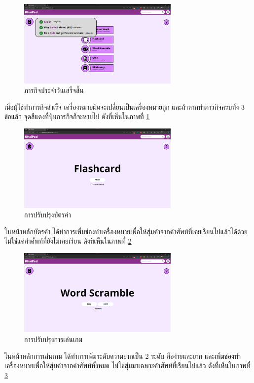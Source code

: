 \documentclass[12pt,oneside,openright,a4paper]{cpe-thai-project}
\begin{document}
\begin{figure}[!h]\centering
	\includegraphics[width=0.7\textwidth, keepaspectratio=true]{image/chap4/Final/quest done.png}
	\caption{{ภารกิจประจำวันเสร็จสิ้น}}\label{fig:chap4FinQuestDone}
\end{figure}
\hspace{1cm}
เมื่อผู้ใช้ทำภารกิจสำเร็จ เครื่องหมายผิดจะเปลี่ยนเป็นเครื่องหมายถูก และถ้าหากทำภารกิจครบทั้ง 3 ข้อแล้ว
จุดสีแดงที่ปุ่มภารกิจก็จะหายไป ดังที่เห็นในภาพที่ \ref{fig:chap4FinQuestDone}

\pagebreak
\begin{figure}[!h]\centering
	\includegraphics[width=0.7\textwidth, keepaspectratio=true]{image/chap4/Final/flash.png}
	\caption{{การปรับปรุงบัตรคำ}}\label{fig:chap4FinFlash}
\end{figure}
\hspace{1cm}
ในหน้าหลักบัตรคำ ได้ทำการเพิ่มช่องทำเครื่องหมายเพื่อให้สุ่มคำจากคำศัพท์ที่เคยเรียนไปแล้วได้ด้วย ไม่ใช่แค่คำศัพท์ที่ยังไม่เคยเรียน
ดังที่เห็นในภาพที่ \ref{fig:chap4FinFlash}

\begin{figure}[!h]\centering
	\includegraphics[width=0.7\textwidth, keepaspectratio=true]{image/chap4/Final/game.png}
	\caption{{การปรับปรุงการเล่นเกม}}\label{fig:chap4FinGame}
\end{figure}
\hspace{1cm}
ในหน้าหลักการเล่นเกม ได้ทำการเพิ่มระดับความยากเป็น 2 ระดับ คือง่ายและยาก และเพิ่มช่องทำเครื่องหมายเพื่อให้สุ่มคำจากคำศัพท์ทั้งหมด
ไม่ใช่สุ่มมาเฉพาะคำศัพท์ที่เรียนไปแล้ว ดังที่เห็นในภาพที่ \ref{fig:chap4FinGame}
\end{document}
